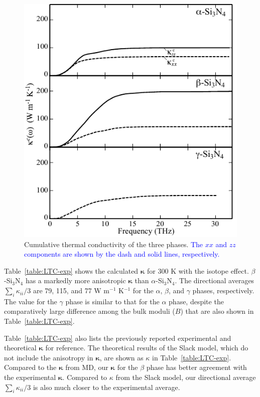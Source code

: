 \documentclass[twocolumn,amsmath,amssymb,a4paper,prb,superscriptaddress,floatfix]{revtex4-1}
\begin{document}
\begin{figure}[H]
         \begin{center}
                   \includegraphics[width=0.90\linewidth]{Figure_kaccum_for_alpha_beta_gamma_phases_iso.pdf}
				   \caption{Cumulative thermal conductivity of the three
					   phases. \textcolor{blue}{The $xx$ and $zz$ components are
					   shown by the dash and solid lines, respectively.}
                   \label{fig:kaccum} }
    \end{center}
\end{figure}
Table~\ref{table:LTC-exp} shows the calculated
$\boldsymbol{\kappa}$ for 300 K with the isotope effect. $\beta$-Si$_3$N$_4$ has a markedly more
anisotropic $\boldsymbol{\kappa}$ than $\alpha$-Si$_3$N$_4$.  The directional
averages $\sum_i \kappa_{ii}/3$  are 79, 115,  and 77 W m$^{-1}$ K$^{-1}$ for the
$\alpha$, $\beta$, and $\gamma$ phases, respectively. The value for the
$\gamma$ phase is similar to that for the $\alpha$ phase, despite the
comparatively large difference among the bulk moduli ($B$) that are also shown
in Table~\ref{table:LTC-exp}.

Table~\ref{table:LTC-exp} also lists the previously reported
experimental\cite{li} and theoretical\cite{hirosaki-md} $\boldsymbol{\kappa}$
for reference. The theoretical results\cite{morelli} of the Slack model, which
do not include the anisotropy in $\boldsymbol{\kappa}$, are shown as $\kappa$ in
Table~\ref{table:LTC-exp}. Compared to the $\boldsymbol{\kappa}$ from
MD\cite{hirosaki-md}, our $\boldsymbol{\kappa}$ for the $\beta$ phase has better
agreement with the experimental $\boldsymbol{\kappa}$.  Compared to $\kappa$
from the Slack model, our directional average $\sum_i \kappa_{ii}/3$ is also
much closer to the experimental average.
\end{document}
